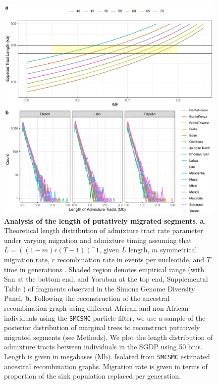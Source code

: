   


\begin{figure}
  \centering
  \includegraphics[width=\textwidth]{plot/both_length.pdf}
  \caption{ {\bf Analysis of the length of putatively migrated segments}. {\bf a.} Theoretical length distribution of admixture tract rate parameter under varying migration and admixture timing assuming that $L = ((1-m)r(T-1))^-1$, given $L$ length, $m$ symmetrical migration rate, $r$ recombination rate in events per nucleotide, and $T$ time in generations \cite{Liang953}. Shaded region denotes empirical range (with San at the bottom end, and Yoruban at the top end, Supplemental Table ) of fragments observed in the Simons Genome Diversity Panel. {\bf b.} Following the reconstruction of the ancestral recombination graph using different African and non-African individuals using the {\tt SMCSMC} particle filter, we use a sample of the posterior distribution of marginal trees to reconstruct putatively migrated segments (see Methods). We plot the length distribution of admixture tracts between individuals in the SGDP using 50 bins. Length is given in megabases (Mb). Isolated from {\tt SMCSMC} estimated ancestral recombination graphs. Migration rate is given in terms of proportion of the sink population replaced per generation. }
  \label{fig:length}
\end{figure}



